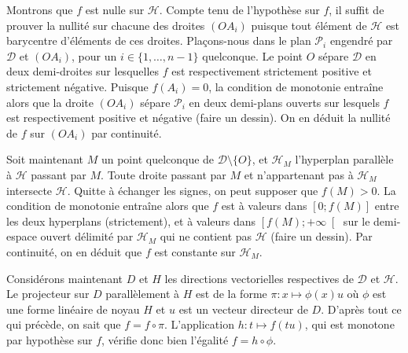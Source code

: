 Montrons que $f$ est nulle sur $\mathcal H$. Compte tenu de l'hypothèse sur $f$, il suffit de prouver la nullité sur chacune des droites $(OA_i)$ puisque tout élément de $\mathcal H$ est barycentre d'éléments de ces droites.
Plaçons-nous dans le plan $\mathcal P_i$ engendré par $\mathcal D$ et $(OA_i)$, pour un $i \in \{1,\dots,n-1\}$ quelconque.
Le point $O$ sépare $\mathcal D$ en deux demi-droites sur lesquelles $f$ est respectivement strictement positive et strictement négative.
Puisque $f(A_i) = 0$, la condition de monotonie entraîne alors que la droite $(OA_i)$ sépare $\mathcal P_i$ en deux demi-plans ouverts sur lesquels $f$ est respectivement positive et négative (faire un dessin).
On en déduit la nullité de $f$ sur $(OA_i)$ par continuité.

Soit maintenant $M$ un point quelconque de $\mathcal D\setminus \{O\}$, et $\mathcal H_M$ l'hyperplan parallèle à $\mathcal H$ passant par $M$.
Toute droite passant par $M$ et n'appartenant pas à $\mathcal H_M$ intersecte $\mathcal H$.
Quitte à échanger les signes, on peut supposer que $f(M) > 0$.
La condition de monotonie entraîne alors que $f$ est à valeurs dans $[0;f(M)]$ entre les deux hyperplans (strictement), et à valeurs dans $\left[f(M);+\infty\right[$ sur le demi-espace ouvert délimité par $\mathcal H_M$ qui ne contient pas $\mathcal H$ (faire un dessin). Par continuité, on en déduit que $f$ est constante sur $\mathcal H_M$.

Considérons maintenant $D$ et $H$ les directions vectorielles respectives de $\mathcal D$ et $\mathcal H$.
Le projecteur sur $D$ parallèlement à $H$ est de la forme $\pi : x \mapsto \phi(x)u$ où $\phi$ est une forme linéaire de noyau $H$ et $u$ est un vecteur directeur de $D$.
D'après tout ce qui précède, on sait que $f = f \circ \pi$.
L'application $h : t \mapsto f(tu)$, qui est monotone par hypothèse sur $f$, vérifie donc bien l'égalité $f = h \circ \phi$.
